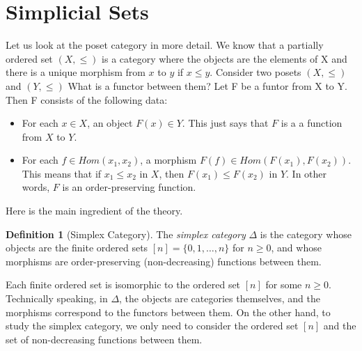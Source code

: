 \documentclass[11pt]{article}
\theoremstyle{definition}
\newtheorem{definition}{Definition}[section]
\theoremstyle{plain}
\begin{document}
\section{Simplicial Sets}
Let us look at the poset category in more detail.
We know that a partially ordered set $(X,\leq)$ is a category where the objects are the elements of X and there is a unique morphism from $x$ to $y$ if $x \leq y$.
Consider two posets $(X,\leq)$ and $(Y,\leq)$  What is a functor between them?
Let F be a funtor from X to Y.
Then F consists of the following data:
\begin{itemize}
    \item For each $x \in X$, an object $F(x) \in Y$. This just says that $F$ is a a function from $X$ to $Y$.
    \item For each $f \in Hom(x_1,x_2)$, a morphism $F(f) \in Hom(F(x_1),F(x_2))$.
          This means that if $x_1 \leq x_2$ in $X$, then $F(x_1) \leq F(x_2)$ in $Y$. In other words, $F$ is an order-preserving function.
\end{itemize}


Here is the main ingredient of the theory.
\begin{definition}[Simplex Category]
    The \emph{simplex category} $\Delta$ is the category whose objects are the finite ordered sets $[n] = \{0,1,\dots,n\}$ for $n \geq 0$, and whose morphisms are order-preserving (non-decreasing) functions between them.
\end{definition}

Each finite ordered set is isomorphic to the ordered set $[n]$ for some $n \geq 0$. Technically speaking, in $\Delta$, the objects are categories themselves, and the morphisms correspond to the functors between them.
On the other hand, to study the simplex category, we only need to consider the ordered set  $[n]$ and the set of non-decreasing functions between them.
\end{document}
